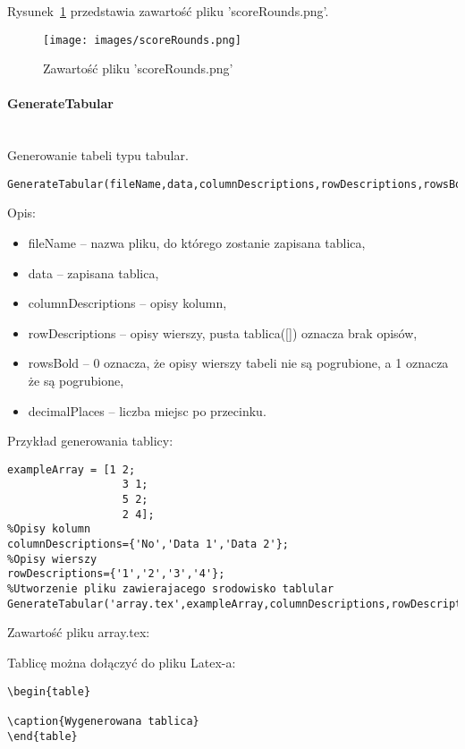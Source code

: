 Rysunek~\ref{Fig:scoreRounds} przedstawia zawartość pliku 'scoreRounds.png'.

\begin{figure}
\texttt{[image: images/scoreRounds.png]}
\caption{Zawartość pliku 'scoreRounds.png'}
\label{Fig:scoreRounds}
\end{figure} 

\paragraph{GenerateTabular} \hspace{0pt} \\
Generowanie tabeli typu tabular.
\begin{lstlisting}[style=Matlab-editor]
GenerateTabular(fileName,data,columnDescriptions,rowDescriptions,rowsBold,decimalPlaces)
\end{lstlisting}

Opis:
\begin{itemize}
\item fileName -- nazwa pliku, do którego zostanie zapisana tablica,
\item data -- zapisana tablica,
\item columnDescriptions -- opisy kolumn,
\item rowDescriptions -- opisy wierszy, pusta tablica([]) oznacza brak opisów,
\item rowsBold -- 0 oznacza, że opisy wierszy tabeli nie są pogrubione, a 1 oznacza że są pogrubione,
\item decimalPlaces -- liczba miejsc po przecinku.
\end{itemize}

Przykład generowania tablicy: 
\begin{lstlisting}[style=Matlab-editor]
%Tablica
exampleArray = [1 2;
                  3 1;
                  5 2;
                  2 4];
%Opisy kolumn
columnDescriptions={'No','Data 1','Data 2'};
%Opisy wierszy
rowDescriptions={'1','2','3','4'};
%Utworzenie pliku zawierajacego srodowisko tablular
GenerateTabular('array.tex',exampleArray,columnDescriptions,rowDescriptions,0,0);
\end{lstlisting}

Zawartość pliku array.tex:


Tablicę można dołączyć do pliku Latex-a: 
\begin{lstlisting}[style=lstStyleLaTeX]
\begin{table}

\caption{Wygenerowana tablica}
\end{table}
\end{lstlisting}

